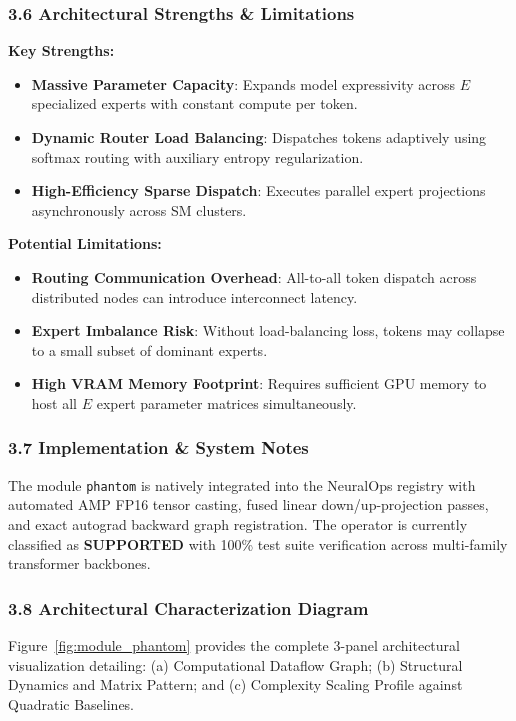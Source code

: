 \subsubsection*{3.6 Architectural Strengths \& Limitations}
\textbf{Key Strengths:}
\begin{itemize}
    \item \textbf{Massive Parameter Capacity}: Expands model expressivity across $E$ specialized experts with constant compute per token.
    \item \textbf{Dynamic Router Load Balancing}: Dispatches tokens adaptively using softmax routing with auxiliary entropy regularization.
    \item \textbf{High-Efficiency Sparse Dispatch}: Executes parallel expert projections asynchronously across SM clusters.
\end{itemize}

\textbf{Potential Limitations:}
\begin{itemize}
    \item \textbf{Routing Communication Overhead}: All-to-all token dispatch across distributed nodes can introduce interconnect latency.
    \item \textbf{Expert Imbalance Risk}: Without load-balancing loss, tokens may collapse to a small subset of dominant experts.
    \item \textbf{High VRAM Memory Footprint}: Requires sufficient GPU memory to host all $E$ expert parameter matrices simultaneously.
\end{itemize}

\subsubsection*{3.7 Implementation \& System Notes}
The module \texttt{phantom} is natively integrated into the NeuralOps registry with automated AMP FP16 tensor casting, fused linear down/up-projection passes, and exact autograd backward graph registration. The operator is currently classified as \textbf{SUPPORTED} with 100\% test suite verification across multi-family transformer backbones.

\subsubsection*{3.8 Architectural Characterization Diagram}
Figure~\ref{fig:module_phantom} provides the complete 3-panel architectural visualization detailing: (a) Computational Dataflow Graph; (b) Structural Dynamics and Matrix Pattern; and (c) Complexity Scaling Profile against Quadratic Baselines.

